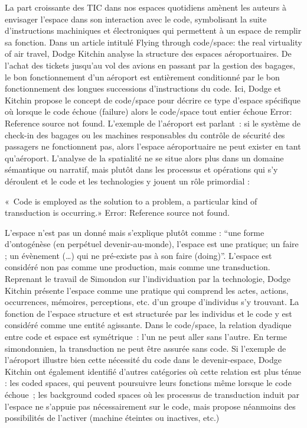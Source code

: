 La part croissante des TIC dans nos espaces quotidiens amènent les auteurs à envisager l’espace dans son interaction avec le code, symbolisant la suite d’instructions machiniques et électroniques qui permettent à un espace de remplir sa fonction. Dans un article intitulé Flying through code/space: the real virtuality of air travel, Dodge  Kitchin analyse la structure des espaces aéroportuaires. De l’achat des tickets jusqu’au vol des avions en passant par la gestion des bagages, le bon fonctionnement d’un aéroport est entièrement conditionné par le bon fonctionnement des longues successions d’instructions du code. Ici, Dodge et Kitchin propose le concept de code/space pour décrire ce type d’espace spécifique où lorsque le code échoue (failure) alors le code/space tout entier échoue Error: Reference source not found. L’exemple de l’aéroport est parlant : si le système de check-in des bagages ou les machines responsables du contrôle de sécurité des passagers ne fonctionnent pas, alors l’espace aéroportuaire ne peut exister en tant qu’aéroport. L’analyse de la spatialité ne se situe alors plus dans un domaine sémantique ou narratif, mais plutôt dans les processus et opérations qui s’y déroulent et le code et les technologies y jouent un rôle primordial : 

« Code is employed as the solution to a problem, a particular kind of transduction 	is occurring.» Error: Reference source not found. 

L’espace n’est pas un donné mais s’explique plutôt comme : “une forme d’ontogénèse (en perpétuel devenir-au-monde), l’espace est une pratique; un faire ; un évènement (…) qui ne pré-existe pas à son faire (doing)”. L’espace est considéré non pas comme une production, mais comme une transduction. Reprenant le travail de Simondon sur l’individuation par la technologie, Dodge  Kitchin présente l’espace comme une pratique qui comprend les actes, actions, occurrences, mémoires, perceptions, etc. d’un groupe d’individus s’y trouvant. La fonction de l’espace structure et est structurée par les individus et le code y est considéré comme une entité agissante. Dans le code/space, la relation dyadique entre code et espace est symétrique : l’un ne peut aller sans l’autre. En terme simondonnien, la transduction ne peut être assurée sans code. Si l’exemple de l’aéroport illustre bien cette nécessité du code dans le devenir-espace, Dodge  Kitchin ont également identifié d’autres catégories où cette relation est plus ténue : les coded spaces, qui peuvent poursuivre leurs fonctions même lorsque le code échoue ; les background coded spaces où les processus de transduction induit par l’espace ne s’appuie pas nécessairement sur le code, mais propose néanmoins des possibilités de l’activer (machine éteintes ou inactives, etc.) 

